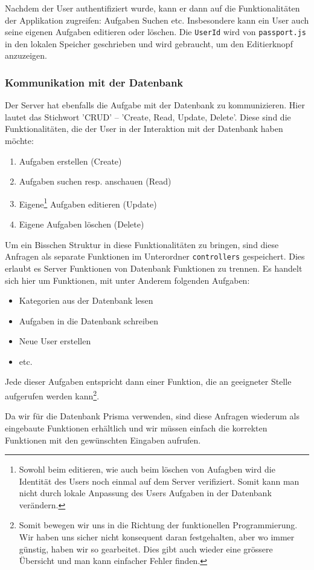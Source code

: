 Nachdem der User authentifiziert wurde, kann er dann auf die Funktionalitäten der Applikation zugreifen: Aufgaben Suchen etc. Insbesondere kann ein User auch seine eigenen Aufgaben editieren oder löschen. Die \verb|UserId| wird von \verb|passport.js| in den lokalen Speicher geschrieben und wird gebraucht, um den Editierknopf anzuzeigen. 

\subsubsection{Kommunikation mit der Datenbank}

Der Server hat ebenfalls die Aufgabe mit der Datenbank zu kommunizieren. Hier lautet das Stichwort 'CRUD' -- 'Create, Read, Update, Delete'. Diese sind die Funktionalitäten, die der User in der Interaktion mit der Datenbank haben möchte:
\begin{enumerate}
    \item Aufgaben erstellen (Create)
    \item Aufgaben suchen resp. anschauen (Read)
    \item Eigene\footnote{Sowohl beim editieren, wie auch beim löschen von Aufagben wird die Identität des Users noch einmal auf dem Server verifiziert. Somit kann man nicht durch lokale Anpassung des Users Aufgaben in der Datenbank verändern.} Aufgaben editieren (Update)
    \item Eigene Aufgaben löschen (Delete)
\end{enumerate}

Um ein Bisschen Struktur in diese Funktionalitäten zu bringen, sind diese Anfragen als separate Funktionen im Unterordner \verb|controllers| gespeichert. Dies erlaubt es Server Funktionen von Datenbank Funktionen zu trennen. Es handelt sich hier um Funktionen, mit unter Anderem folgenden Aufgaben:
\begin{itemize}
    \item Kategorien aus der Datenbank lesen
    \item Aufgaben in die Datenbank schreiben
    \item Neue User erstellen
    \item etc.
\end{itemize}

Jede dieser Aufgaben entspricht dann einer Funktion, die an geeigneter Stelle aufgerufen werden kann\footnote{Somit bewegen wir uns in die Richtung der funktionellen Programmierung. Wir haben uns sicher nicht konsequent daran festgehalten, aber wo immer günstig, haben wir so gearbeitet. Dies gibt auch wieder eine grössere Übersicht und man kann einfacher Fehler finden.}. 

Da wir für die Datenbank Prisma verwenden, sind diese Anfragen wiederum als eingebaute Funktionen erhältlich und wir müssen einfach die korrekten Funktionen mit den gewünschten Eingaben aufrufen. 


